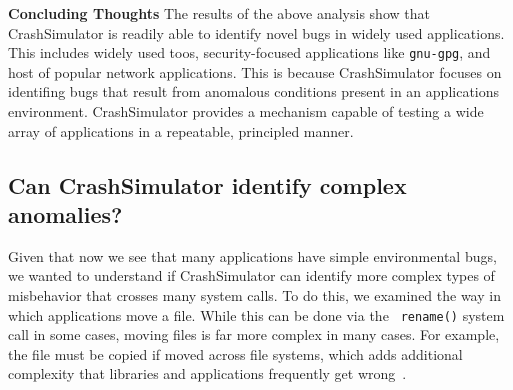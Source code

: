 {\bf Concluding Thoughts}
The results of the above analysis show that CrashSimulator is readily able to
identify novel bugs in widely used applications.  This includes
widely used toos, security-focused applications like {\tt gnu-gpg}, and 
host of popular network applications.  This is
because CrashSimulator focuses on identifing bugs that result from anomalous
conditions present in an applications environment.  CrashSimulator provides
a mechanism capable of testing a wide array of applications in a
repeatable, principled manner.



\subsection{Can CrashSimulator identify complex anomalies?}
\label{sec-complex}


Given that now we see that many applications have simple environmental bugs,
we wanted to understand if CrashSimulator can identify more complex types
of misbehavior that crosses many system calls.  To do this, we examined the
way in which applications move a file.  While this can be done via the {\tt
rename()} system call in some cases, moving files is far more complex in
many cases.  For example, the file must be copied if moved across file
systems, which adds additional complexity that libraries and applications
frequently get wrong~\cite{PHPRenameBug,PythonShutilBug,NodejsCopyBug}.

